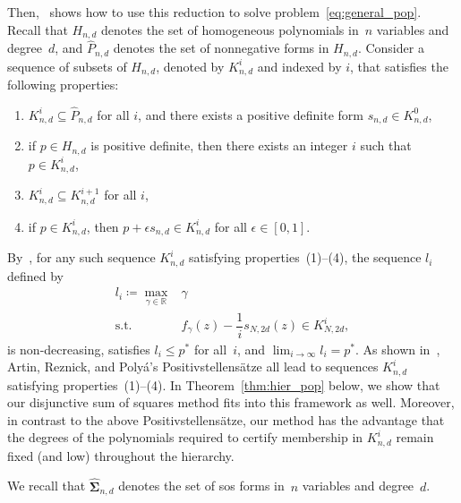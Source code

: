 \documentclass[12pt]{article}
\newcommand{\reals}{\mathbb{R}}
\newcommand{\HNN}{\widehat{P}}
\newcommand{\HSOS}{\widehat{\mathbf{\Sigma}}}
\newcommand{\defeq}{\coloneq}
\newcommand{\st}{\text{s.t.}}
\theoremstyle{remark}
\begin{document}
Then,~\cite[Theorem 2.4]{aaa2019} shows how to use this reduction to solve problem~\eqref{eq:general_pop}. 
Recall that $H_{n,d}$ denotes the set of homogeneous polynomials in~$n$ variables and degree~$d$, and $\HNN_{n,d}$ denotes the set of nonnegative forms in $H_{n,d}$. 
Consider a sequence of subsets of $H_{n,d}$, denoted by $K_{n,d}^i$ and indexed by $i$, that satisfies the following properties:
\begin{enumerate}[label=(\arabic*)]
    \item $K_{n,d}^i\subseteq \HNN_{n,d}$ for all $i$, and there exists a positive definite form $s_{n,d}\in K^0_{n,d}$,
    \item if $p\in H_{n,d}$ is positive definite, then there exists an integer $i$ such that $p\in K_{n,d}^i$,
    \item $K_{n,d}^i\subseteq K_{n,d}^{i+1}$ for all $i$,
    \item if $p\in K_{n,d}^i$, then $p + \epsilon s_{n,d}\in K_{n,d}^i$ for all $\epsilon\in[0,1]$.
\end{enumerate}

By~\cite[Theorem 2.4]{aaa2019}, 
for any such sequence $K_{n,d}^i$ satisfying properties~(1)--(4), the sequence $l_i$ defined by
\begin{equation}\label{eq:general_hierarchy}
     	\begin{array}{rl}
		l_i \defeq \max\limits_{\gamma\in\reals} & \gamma\\
		\st & f_{\gamma}(z)-\dfrac{1}{i}s_{N,2d}(z)\in K_{N,2d}^i,
	\end{array}  
\end{equation}
is non-decreasing, satisfies $l_i\le p^*$ for all~$i$, and $\lim_{i\to\infty} l_i=p^*$. 
As shown in~\cite{aaa2019}, 
Artin, Reznick, and Poly\'a's Positivstellens\"atze all lead to sequences $K_{n,d}^i$ satisfying properties~(1)--(4).
In Theorem~\ref{thm:hier_pop} below, we show that our disjunctive sum of squares method fits into this framework as well. 
Moreover, in contrast to the above Positivstellens\"atze, our method has the 
advantage that the degrees of the polynomials required to certify membership in $K_{n,d}^i$ remain fixed (and low) throughout the hierarchy.

We recall that $\HSOS_{n,d}$ denotes the set of sos forms in~$n$ variables and degree~$d$.
\end{document}
